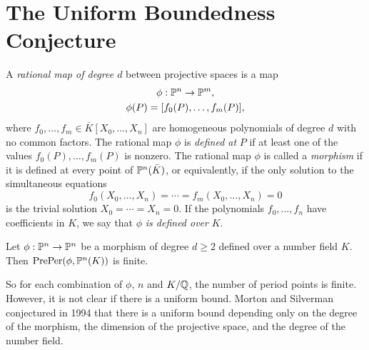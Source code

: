 



\section{The Uniform Boundedness Conjecture}

\begin{definition}
\end{definition}

\begin{definition}
  A \emph{rational map of degree $d$} between projective spaces is a
  map
  \[
  \begin{gathered}
    \phi: \P^n \to \P^m,\\
    \phi(P) = [f_0(P), \dots, f_m(P)],
  \end{gathered}
  \]
  where $f_0, \dots, f_m \in \bar{K}[X_0, \dots, X_n]$ are homogeneous
  polynomials of degree $d$ with no common factors. The rational map
  $\phi$ is \emph{defined at} $P$ if at least one of the values
  $f_0(P), \dots, f_m(P)$ is nonzero. The rational map $\phi$ is
  called a \emph{morphism} if it is defined at every point of
  $\P^n(\bar{K})$, or equivalently, if the only solution to the
  simultaneous equations
  \[
  f_0(X_0, \dots, X_n) = \cdots = f_m(X_0, \dots, X_n) = 0
  \]
  is the trivial solution $X_0 = \cdots = X_n = 0$. If the polynomials
  $f_0, \dots, f_n$ have coefficients in $K$, we say that $\phi$
  \emph{is defined over} $K$.
\end{definition}

\begin{example}[Morphism]
\end{example}

\begin{definition}
\end{definition}

\begin{theorem}[Northcott, 1950]
  Let $\phi: \P^n \to \P^n$ be a morphism of degree $d \ge 2$ defined
  over a number field $K$. Then $\preper(\phi, \P^n(K))$ is finite.
\end{theorem}

\begin{remark}
  So for each combination of $\phi$, $n$ and $K/\Q$, the number of
  period points is finite. However, it is not clear if there is a
  uniform bound. Morton and Silverman conjectured in 1994 that there
  is a uniform bound depending only on the degree of the morphism, the
  dimension of the projective space, and the degree of the number
  field.
\end{remark}

